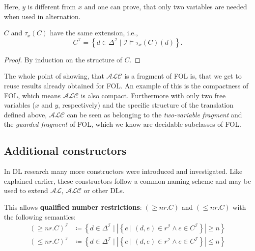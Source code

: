 \begin{note}
Here, $y$ is different from $x$ and one can prove, that only two variables are needed when used in alternation.
\end{note}

\begin{lemma}
	$C$ and $\tau_{x}(C)$ have the same extension, i.e.,
	\[
		C^{\mathcal{I}} = \left\{ d \in \Delta^{\mathcal{I}} \mid \mathcal{I} \vDash \tau_{x}(C)(d) \right\} 
	.\] 
\end{lemma}
\begin{proof}
	By induction on the structure of $C$.
\end{proof}
The whole point of showing, that $\mathcal{ALC}$ is a fragment of FOL is, that we get to reuse results already obtained for FOL.
An example of this is the compactness of FOL, which means $\mathcal{ALC}$ is also compact.
Furthermore with only two free variables ($x$ and $y$, respectively) and the specific structure of the translation defined above,
$\mathcal{ALC}$ can be seen as belonging to the \textit{two-variable fragment} and the \textit{guarded fragment} of FOL,
which we know are decidable subclasses of FOL.

\subsection{Additional constructors}
In DL research many more constructors were introduced and investigated.
Like explained earlier, these constructors follow a common naming scheme and may be used to extend $\mathcal{AL}$, $\mathcal{ALC}$ or other DLs.
\begin{definition*}
	This allows \textbf{qualified number restrictions}: 
	$\left( \geq nr.C \right) $ and $\left( \leq nr.C \right) $ with the following semantics:
	\begin{align*}
		\left( \geq nr.C \right) ^{\mathcal{I}} &\coloneqq \left\{ d \in \Delta^{\mathcal{I}} \mid \left| \left\{ e \mid (d,e) \in r^{\mathcal{I}} \land e \in C^{\mathcal{I}} \right\} \right| \geq n \right\} \\
		\left( \leq nr.C \right) ^{\mathcal{I}} &\coloneqq \left\{ d \in \Delta^{\mathcal{I}} \mid \left| \left\{ e \mid (d,e) \in r^{\mathcal{I}} \land e \in C^{\mathcal{I}} \right\} \right| \leq n \right\} \\
	\end{align*}
\end{definition*}

